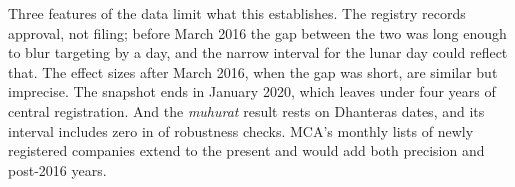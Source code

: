 \documentclass[12pt,letterpaper]{article}
\newcommand{\muhurat}{\textit{muhurat}}
\begin{document}
Three features of the data limit what this establishes. The registry records approval, not filing; before March 2016 the gap between the two was long enough to blur targeting by a day, and the narrow interval for the lunar day could reflect that. The effect sizes after March 2016, when the gap was short, are similar but imprecise. The snapshot ends in January 2020, which leaves under four years of central registration. And the \muhurat{} result rests on \NDhanterasDates{} Dhanteras dates, and its interval includes zero in \RobPTwoInclZero{} of \RobN{} robustness checks. MCA's monthly lists of newly registered companies extend to the present and would add both precision and post-2016 years.


\end{document}
